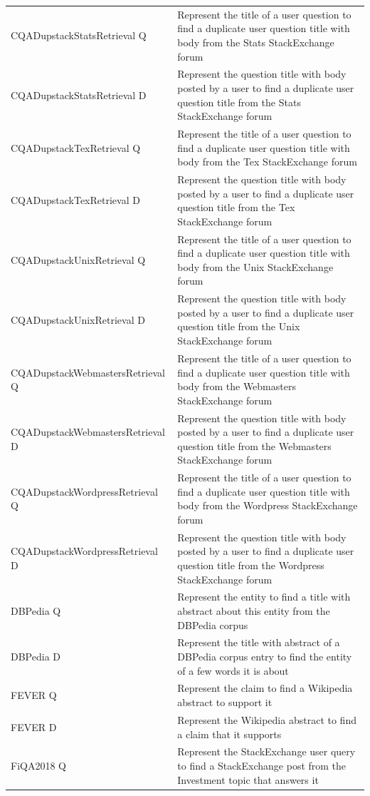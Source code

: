 \documentclass{article}
\begin{document}
\begin{longtable}{lp{9cm}}
CQADupstackStatsRetrieval Q & Represent the title of a user question to find a duplicate user question title with body from the Stats StackExchange forum \\
CQADupstackStatsRetrieval D & Represent the question title with body posted by a user to find a duplicate user question title from the Stats StackExchange forum \\
CQADupstackTexRetrieval Q & Represent the title of a user question to find a duplicate user question title with body from the Tex StackExchange forum \\
CQADupstackTexRetrieval D & Represent the question title with body posted by a user to find a duplicate user question title from the Tex StackExchange forum \\
CQADupstackUnixRetrieval Q & Represent the title of a user question to find a duplicate user question title with body from the Unix StackExchange forum \\
CQADupstackUnixRetrieval D & Represent the question title with body posted by a user to find a duplicate user question title from the Unix StackExchange forum \\
CQADupstackWebmastersRetrieval Q & Represent the title of a user question to find a duplicate user question title with body from the Webmasters StackExchange forum \\
CQADupstackWebmastersRetrieval D & Represent the question title with body posted by a user to find a duplicate user question title from the Webmasters StackExchange forum \\
CQADupstackWordpressRetrieval Q & Represent the title of a user question to find a duplicate user question title with body from the Wordpress StackExchange forum \\
CQADupstackWordpressRetrieval D & Represent the question title with body posted by a user to find a duplicate user question title from the Wordpress StackExchange forum \\
DBPedia Q & Represent the entity to find a title with abstract about this entity from the DBPedia corpus \\
DBPedia D & Represent the title with abstract of a DBPedia corpus entry to find the entity of a few words it is about \\
FEVER Q & Represent the claim to find a Wikipedia abstract to support it \\
FEVER D & Represent the Wikipedia abstract to find a claim that it supports \\
FiQA2018 Q & Represent the StackExchange user query to find a StackExchange post from the Investment topic that answers it \\

\end{longtable}
\end{document}
